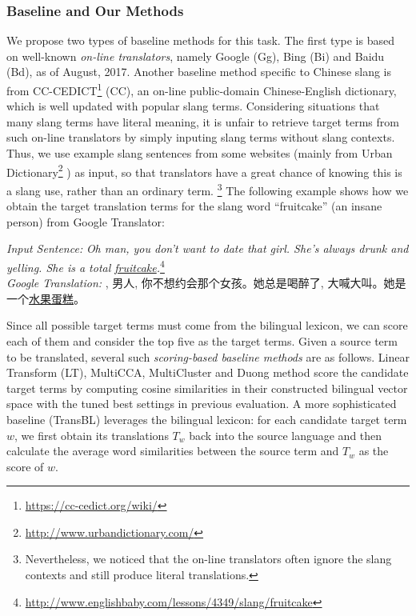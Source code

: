 \subsubsection{Baseline and Our Methods} 
We propose two types of baseline methods for this task. 
The first type is based on well-known {\em on-line translators}, 
namely Google (Gg), 
Bing (Bi) and Baidu (Bd), as of August, 2017.  
Another baseline method specific to Chinese slang is from CC-CEDICT\footnote{{\url{https://cc-cedict.org/wiki/}}} (CC), an on-line public-domain Chinese-English dictionary, which is well updated with popular slang terms. 
Considering situations that many slang terms have literal meaning, it is unfair to retrieve target terms from such on-line translators by simply inputing slang terms without slang contexts. 
Thus, we use example slang sentences from some websites (mainly from Urban 
Dictionary\footnote{{\url{http://www.urbandictionary.com/}}} ) 
as input, so that translators have a great chance of knowing this is
a slang use, rather than an ordinary term. \footnote{Nevertheless, we noticed
that the on-line translators often ignore the slang contexts and still produce
literal translations.}
The following example shows how we obtain the target translation terms 
for the slang word ``fruitcake'' (an insane person) from Google Translator:

\noindent
\textit{Input Sentence:}
{\textit{Oh man, you don't want to date that girl. She's always drunk and yelling. She is a total \underline{fruitcake}.}}\footnote{{\url{http://www.englishbaby.com/lessons/4349/slang/fruitcake}}}\\ 
\textit{Google Translation:}
{, 男人, 你不想约会那个女孩。她总是喝醉了, 大喊大叫。她是一个\underline{水果蛋糕}。}

Since all possible target terms must come from the bilingual lexicon, 
we can score each of them and consider the top five as the target 
terms. 
Given a source term to be translated, several such {\em scoring-based 
baseline methods} are as follows.
Linear Transform (LT), MultiCCA, MultiCluster and Duong method score the candidate target terms by 
computing cosine similarities in their constructed bilingual vector space with the tuned best settings in previous evaluation. 
A more sophisticated baseline (TransBL) leverages the bilingual lexicon: 
for each candidate target term $w$, we first obtain its translations 
$T_w$ back into the source language and then calculate the average word similarities between the source term and $T_w$  as the score of $w$. 

